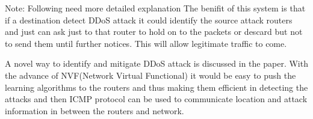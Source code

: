 \documentclass[10pt,oneside,a4paper]{article}
\begin{document}
{Note: Following need more detailed explanation}
The benifit of this system is that if a destination detect DDoS attack it could identify the source attack routers and just can ask just to that router to hold on to the packets or descard but not to send them until further notices. This will allow legitimate traffic to come.

A novel way to identify and mitigate DDoS attack is discussed in the paper. With the advance of NVF(Network Virtual Functional) it would be easy to push the learning algorithms to the routers and thus making them efficient in detecting the attacks and then ICMP protocol can be used to communicate location and attack information in between the routers and network.

\end{document}
